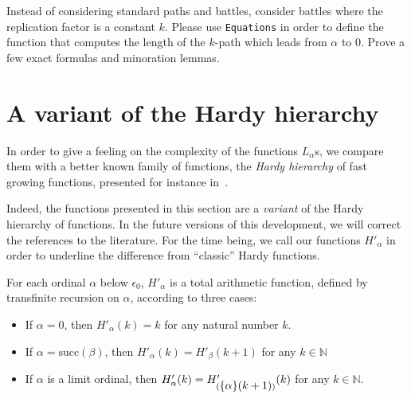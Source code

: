 


\begin{exercise}
Instead of considering standard paths and battles, consider battles where the replication factor is a constant $k$. Please use \texttt{Equations} in order to define the function that computes the length of the $k$-path which leads  from $\alpha$ to $0$.
Prove a few  exact formulas and minoration lemmas.
\end{exercise}

\section{A variant of the Hardy hierarchy}

\label{sect:hardy}




In order to give a feeling on  the complexity of the functions  $L_\alpha$s, we compare them with a better known family of functions, the  \emph{Hardy hierarchy} of fast growing functions,
presented for instance in~\cite{Promel2013}. 

\begin{remark}
  Indeed, the functions presented in this section are a \emph{variant} of the Hardy hierarchy of functions. In the future versions of this development, we will correct the references to the literature. For the time being, we call our functions $H'_\alpha$ in order to underline the difference from ``classic'' Hardy functions.
\end{remark}

For each ordinal $\alpha$ below $\epsilon_0$, $H'_\alpha$ is 
a total arithmetic function, defined  by  transfinite recursion on $\alpha$, according to three cases:


\begin{itemize}
\item If $\alpha=0$, then $H'_\alpha (k)= k$ for any natural number $k$.
\item If $\alpha=\textrm{succ}(\beta)$, then 
$H'_\alpha(k)=H'_\beta(k+1)$ for any $k \in \mathbb{N}$
\item If $\alpha$ is a limit ordinal, then 
$H'_\alpha(k) = H'_{(\mbox{$\{\alpha\}(k+1)$})}(k)$ for any $k\in \mathbb{N}$.
\end{itemize}

